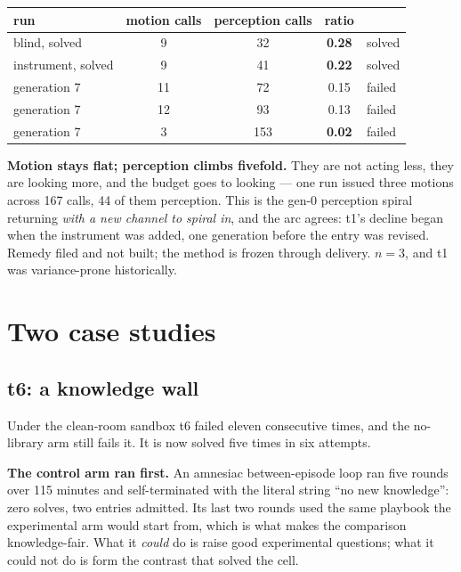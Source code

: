 \documentclass[11pt,a4paper]{report}
\newcommand{\keyrule}[1]{\textbf{\textcolor{acc}{#1}}}
\begin{document}
\begin{table}[htbp]
\centering\small
\begin{tabular}{@{}l c c c l@{}}
\toprule
\textbf{run} & \textbf{motion calls} & \textbf{perception calls} & \textbf{ratio} & \\
\midrule
blind, solved      & 9  & 32  & \textbf{0.28} & solved \\
instrument, solved & 9  & 41  & \textbf{0.22} & solved \\
generation 7       & 11 & 72  & 0.15 & failed \\
generation 7       & 12 & 93  & 0.13 & failed \\
generation 7       & 3  & 153 & \textbf{0.02} & failed \\
\bottomrule
\end{tabular}
\end{table}

\noindent
\textbf{Motion stays flat; perception climbs fivefold.} They are not acting
less, they are looking more, and the budget goes to looking --- one run issued
three motions across 167 calls, 44 of them perception. This is the gen-0
perception spiral returning \emph{with a new channel to spiral in}, and the arc
agrees: t1's decline began when the instrument was added, one generation before
the entry was revised. Remedy filed and not built; the method is frozen through
delivery. $n=3$, and t1 was variance-prone historically.

\chapter{Two case studies}

\section{t6: a knowledge wall}

Under the clean-room sandbox t6 failed eleven consecutive times, and the
no-library arm still fails it. It is now solved five times in six attempts.

\keyrule{The control arm ran first.} An amnesiac between-episode loop ran five
rounds over 115 minutes and self-terminated with the literal string ``no new
knowledge'': zero solves, two entries admitted. Its last two rounds used the same
playbook the experimental arm would start from, which is what makes the
comparison knowledge-fair. What it \emph{could} do is raise good experimental
questions; what it could not do is form the contrast that solved the cell.
\end{document}
